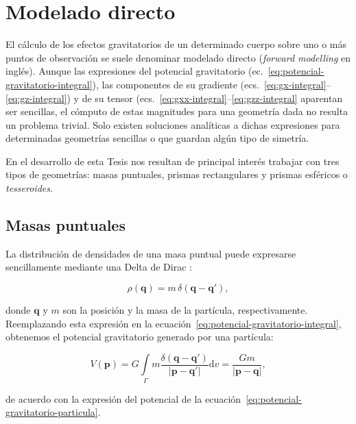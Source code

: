 \section{Modelado directo}

El cálculo de los efectos gravitatorios de un determinado cuerpo sobre uno
o más puntos de observación se suele denominar modelado directo (\emph{forward
modelling} en inglés).
Aunque las expresiones del potencial gravitatorio
(ec.~\ref{eq:potencial-gravitatorio-integral}),
las componentes de su gradiente
(ecs.~\ref{eq:gx-integral}--\ref{eq:gz-integral})
y de su tensor (ecs.~\ref{eq:gxx-integral}--\ref{eq:gzz-integral}
aparentan ser sencillas, el cómputo de estas magnitudes para una geometría dada
no resulta un problema trivial.
Solo existen soluciones analíticas a dichas expresiones para determinadas
geometrías sencillas o que guardan algún tipo de simetría.

En el desarrollo de esta Tesis nos resultan de principal interés trabajar con
tres tipos de geometrías: masas puntuales, prismas rectangulares y prismas
esféricos o \emph{tesseroides}.

\subsection{Masas puntuales}

La distribución de densidades de una masa puntual puede expresarse
sencillamente mediante una Delta de Dirac \citep{vladimirov1979}:

\begin{equation}
    \rho(\mathbf{q}) = m \, \delta(\mathbf{q} - \mathbf{q'}),
\end{equation}

\noindent donde $\mathbf{q}$ y $m$ son la posición y la masa de la partícula,
respectivamente.
Reemplazando esta expresión en la
ecuación~\ref{eq:potencial-gravitatorio-integral}, obtenemos el potencial
gravitatorio generado por una partícula:

\begin{equation}
    V(\mathbf{p}) =
        G \int\limits_\Gamma
        m \frac{\delta(\mathbf{q} - \mathbf{q'})}{|\mathbf{p} - \mathbf{q'}|}
        \text{d}v =
        \frac{G m}{|\mathbf{p} - \mathbf{q}|},
    \label{eq:potencial-masa-puntual}
\end{equation}

\noindent de acuerdo con la expresión del potencial de la
ecuación~\ref{eq:potencial-gravitatorio-particula}.

